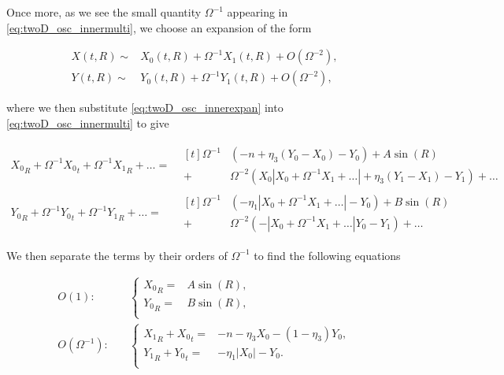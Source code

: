 Once more, as we see the small quantity $\Omega^{-1}$ appearing in \eqref{eq:twoD_osc_innermulti}, we choose an expansion of the form

\begin{equation}\label{eq:twoD_osc_innerexpan}
\begin{aligned}
X(t,R)\sim& X_0(t,R)+\Omega^{-1}X_1(t,R)+O(\Omega^{-2}),\\
Y(t,R)\sim& Y_0(t,R)+\Omega^{-1}Y_1(t,R)+O(\Omega^{-2}),
\end{aligned}
\end{equation}

where we then substitute \eqref{eq:twoD_osc_innerexpan} into \eqref{eq:twoD_osc_innermulti} to give

\begin{equation*}
\begin{aligned}
{X_0}_R+\Omega^{-1}{X_0}_t+\Omega^{-1}{X_1}_R+\ldots=&\begin{aligned}[t]\Omega^{-1}&(-n+\eta_3(Y_0-X_0)-Y_0)+A\sin(R)\\
+&\Omega^{-2}(X_0|X_0+\Omega^{-1}X_1+\ldots|+\eta_3(Y_1-X_1)-Y_1)+\ldots
\end{aligned}\\
{Y_0}_R+\Omega^{-1}{Y_0}_t+\Omega^{-1}{Y_1}_R+\ldots=&\begin{aligned}[t]\Omega^{-1}&(-\eta_1|X_0+\Omega^{-1}X_1+\ldots|-Y_0)+B\sin(R)\\
+&\Omega^{-2}(-|X_0+\Omega^{-1}X_1+\ldots|Y_0-Y_1)+\ldots
\end{aligned}
\end{aligned}
\end{equation*}

We then separate the terms by their orders of $\Omega^{-1}$ to find the following equations

\begin{align}
\label{eq:twoD_osc_innerO1}
O(1):\quad & \begin{cases}
	{X_0}_R =& A\sin(R), \\
	{Y_0}_R =& B\sin(R),\\
\end{cases}\\
\label{eq:twoD_osc_innerO2}
O(\Omega^{-1}):\quad & \begin{cases}
	{X_1}_R+{X_0}_t =& -n-\eta_3X_0-(1-\eta_3)Y_0, \\
	{Y_1}_R+{Y_0}_t =& -\eta_1|X_0|-Y_0.\\
\end{cases}
\end{align}

